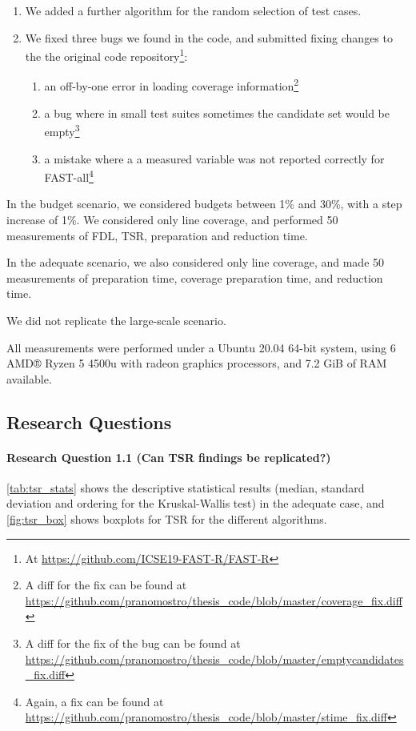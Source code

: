 \begin{enumerate}
\item We added a further algorithm for the random selection of test cases.
\item We fixed three bugs we found in the code, and submitted fixing changes to the the original code repository\footnote{At \url{https://github.com/ICSE19-FAST-R/FAST-R}}:
	\begin{enumerate}
	\item an off-by-one error in loading coverage information\footnote{A diff for the fix can be found at \url{https://github.com/pranomostro/thesis_code/blob/master/coverage_fix.diff}}
	\item a bug where in small test suites sometimes the candidate set would be empty\footnote{A diff for the fix of the bug can be found at \url{https://github.com/pranomostro/thesis_code/blob/master/emptycandidates_fix.diff}}
	\item a mistake where a a measured variable was not reported correctly for FAST-all\footnote{Again, a fix can be found at \url{https://github.com/pranomostro/thesis_code/blob/master/stime_fix.diff}}
	\end{enumerate}
\end{enumerate}

In the budget scenario, we considered budgets between 1\% and 30\%, with
a step increase of 1\%. We considered only line coverage, and performed
50 measurements of FDL, TSR, preparation and reduction time.

In the adequate scenario, we also considered only line coverage, and
made 50 measurements of preparation time, coverage preparation time,
and reduction time.

We did not replicate the large-scale scenario.

All measurements were performed under a Ubuntu 20.04 64-bit system,
using 6 AMD® Ryzen 5 4500u with radeon graphics processors, and 7.2
GiB of RAM available.

\subsection{Research Questions}

\paragraph{Research Question 1.1 (Can TSR findings be replicated?)}

\autoref{tab:tsr_stats} shows the descriptive statistical results
(median, standard deviation and ordering for the Kruskal-Wallis test)
in the adequate case, and \autoref{fig:tsr_box} shows boxplots for
TSR for the different algorithms.

